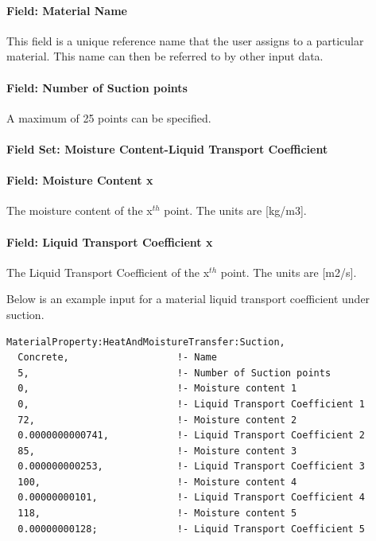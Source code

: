 \paragraph{Field: Material Name}\label{field-material-name-2}

This field is a unique reference name that the user assigns to a particular material. This name can then be referred to by other input data.

\paragraph{Field: Number of Suction points}\label{field-number-of-suction-points}

A maximum of 25 points can be specified.

\paragraph{Field Set: Moisture Content-Liquid Transport Coefficient}\label{field-set-moisture-content-liquid-transport-coefficient}

\paragraph{Field: Moisture Content x}\label{field-moisture-content-x-1}

The moisture content of the x\(^{th}\) point. The units are {[}kg/m3{]}.

\paragraph{Field: Liquid Transport Coefficient x}\label{field-liquid-transport-coefficient-x}

The Liquid Transport Coefficient of the x\(^{th}\) point. The units are {[}m2/s{]}.

Below is an example input for a material liquid transport coefficient under suction.

\begin{lstlisting}
MaterialProperty:HeatAndMoistureTransfer:Suction,
  Concrete,                   !- Name
  5,                          !- Number of Suction points
  0,                          !- Moisture content 1
  0,                          !- Liquid Transport Coefficient 1
  72,                         !- Moisture content 2
  0.0000000000741,            !- Liquid Transport Coefficient 2
  85,                         !- Moisture content 3
  0.000000000253,             !- Liquid Transport Coefficient 3
  100,                        !- Moisture content 4
  0.00000000101,              !- Liquid Transport Coefficient 4
  118,                        !- Moisture content 5
  0.00000000128;              !- Liquid Transport Coefficient 5
\end{lstlisting}

